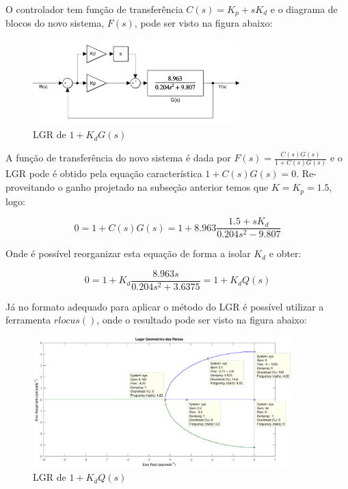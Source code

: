 \documentclass[conference,harvard,brazil,english]{sbatex}
\begin{document}
            O controlador tem função de transferência $C(s) = K_p + sK_d$ e o diagrama de blocos do novo sistema, $F(s)$, pode ser visto na figura abaixo:
            
            \begin{figure}[h]
                \centering
                \includegraphics[width=8cm]{imagens/graficos/DiagramaKD.png}
                \caption{LGR de $1+K_dG(s)$}
            \end{figure}
            
            A função de transferência do novo sistema é dada por $F(s) = \frac{C(s)G(s)}{1+C(s)G(s)}$ e o LGR pode é obtido pela equação característica $1+C(s)G(s)=0$. Re-proveitando o ganho projetado na subseção anterior temos que $K=K_p=1.5$, logo:
            
            \begin{equation}
                0 = 1 + C(s)G(s) = 1 + 8.963\frac{1.5 + sK_d}{0.204s^2 - 9.807}
            \end{equation}
            
            Onde é possível reorganizar esta equação de forma a isolar $K_d$ e obter:
            
            \begin{equation}
                0 = 1 + K_d\frac{8.963s}{0.204s^2 + 3.6375} = 1 + K_dQ(s)
            \end{equation}
            
            Já no formato adequado para aplicar o método do LGR é possível utilizar a ferramenta $rlocus()$, onde o resultado pode ser visto na figura abaixo:
            
            \begin{figure}[h]
                \hspace{-18mm}
                \includegraphics[width=10cm]{imagens/graficos/LGR-Kd.eps}
                \caption{LGR de $1 + K_dQ(s)$}
            \end{figure}
            
\end{document}

